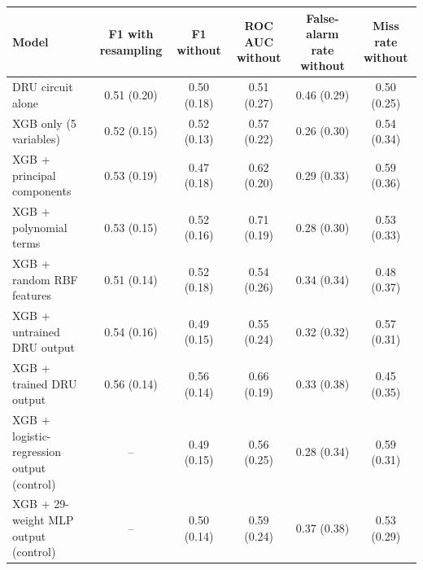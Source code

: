 \begin{tabular}{lccccc}
\toprule
Model & F1 with resampling & F1 without & ROC AUC without & False-alarm rate without & Miss rate without \\
\midrule
DRU circuit alone & 0.51 (0.20) & 0.50 (0.18) & 0.51 (0.27) & 0.46 (0.29) & 0.50 (0.25) \\
XGB only (5 variables) & 0.52 (0.15) & 0.52 (0.13) & 0.57 (0.22) & 0.26 (0.30) & 0.54 (0.34) \\
XGB + principal components & 0.53 (0.19) & 0.47 (0.18) & 0.62 (0.20) & 0.29 (0.33) & 0.59 (0.36) \\
XGB + polynomial terms & 0.53 (0.15) & 0.52 (0.16) & 0.71 (0.19) & 0.28 (0.30) & 0.53 (0.33) \\
XGB + random RBF features & 0.51 (0.14) & 0.52 (0.18) & 0.54 (0.26) & 0.34 (0.34) & 0.48 (0.37) \\
XGB + untrained DRU output & 0.54 (0.16) & 0.49 (0.15) & 0.55 (0.24) & 0.32 (0.32) & 0.57 (0.31) \\
XGB + trained DRU output & 0.56 (0.14) & 0.56 (0.14) & 0.66 (0.19) & 0.33 (0.38) & 0.45 (0.35) \\
XGB + logistic-regression output (control) & -- & 0.49 (0.15) & 0.56 (0.25) & 0.28 (0.34) & 0.59 (0.31) \\
XGB + 29-weight MLP output (control) & -- & 0.50 (0.14) & 0.59 (0.24) & 0.37 (0.38) & 0.53 (0.29) \\
\bottomrule
\end{tabular}
